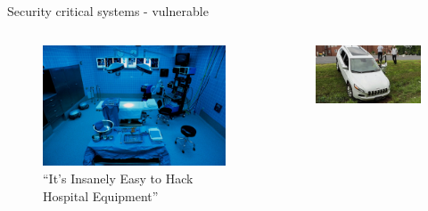 \documentclass[xcolor={x11names}]{beamer}
\begin{document}
\begin{frame}{Security critical systems - vulnerable}
    \pause
    \begin{columns}
        \begin{column}{0.5\textwidth}
            \begin{figure}
                \centering
                \includegraphics[height=.3\textheight]{figures/hospital-hacking.jpg}
                \caption{``It's Insanely Easy to Hack Hospital Equipment'' \cite{zetter_its_2014}}
                \label{hack_hospital}
            \end{figure}
        \end{column}
        \pause
        \begin{column}{0.5\textwidth}
            \begin{figure}
                \centering
                \includegraphics[height=.3\textheight]{figures/jeep_offroad.jpg}

\end{figure}
\end{column}
\end{columns}
\end{frame}
\end{document}
